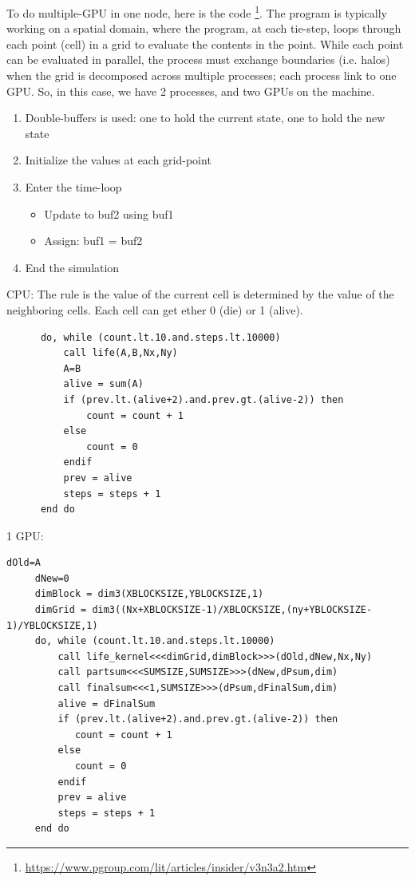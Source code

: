 To do multiple-GPU in one node, here is the code
\footnote{\url{https://www.pgroup.com/lit/articles/insider/v3n3a2.htm}}. The
program is typically working on a spatial domain, where the program, at each
tie-step, loops through each point (cell) in a grid to evaluate the contents in
the point. While each point can be evaluated in parallel, the process must
exchange boundaries (i.e. halos) when the grid is decomposed across multiple
processes; each process link to one GPU. So, in this case, we have 2 processes,
and two GPUs on the machine.
\begin{enumerate}
  \item Double-buffers is used: one to hold the current state, one to hold the
  new state
  \item Initialize the values at each grid-point
  \item Enter the time-loop
  \begin{itemize}
    \item Update to buf2 using buf1
    \item Assign: buf1 = buf2
  \end{itemize}
  \item End the simulation
\end{enumerate}

CPU: The rule is the value of the current cell is determined by the value of the
neighboring cells. Each cell can get ether 0 (die) or 1 (alive).
\begin{verbatim}
      do, while (count.lt.10.and.steps.lt.10000)
          call life(A,B,Nx,Ny)
          A=B
          alive = sum(A)
          if (prev.lt.(alive+2).and.prev.gt.(alive-2)) then
              count = count + 1
          else
              count = 0
          endif
          prev = alive
          steps = steps + 1
      end do
\end{verbatim}

1 GPU:
\begin{verbatim}
dOld=A
     dNew=0
     dimBlock = dim3(XBLOCKSIZE,YBLOCKSIZE,1)
     dimGrid = dim3((Nx+XBLOCKSIZE-1)/XBLOCKSIZE,(ny+YBLOCKSIZE-1)/YBLOCKSIZE,1)
     do, while (count.lt.10.and.steps.lt.10000)
         call life_kernel<<<dimGrid,dimBlock>>>(dOld,dNew,Nx,Ny)
         call partsum<<<SUMSIZE,SUMSIZE>>>(dNew,dPsum,dim)
         call finalsum<<<1,SUMSIZE>>>(dPsum,dFinalSum,dim)
         alive = dFinalSum
         if (prev.lt.(alive+2).and.prev.gt.(alive-2)) then
            count = count + 1
         else
            count = 0
         endif
         prev = alive
         steps = steps + 1
     end do
\end{verbatim}

